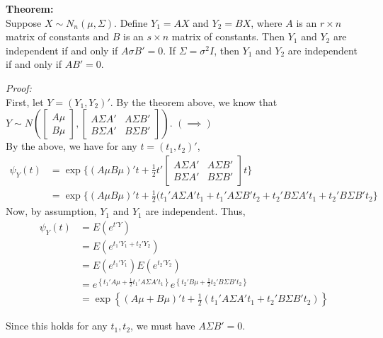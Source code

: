 \documentclass[12pt]{article}
\numberwithin{equation}{section}
\begin{document}
\textbf{Theorem:} \\
Suppose $X \sim N_n(\mu, \Sigma)$. Define $Y_1 = AX$ and $Y_2 = BX$, where $A$ is an $r \times n$ matrix of constants and $B$ is an $s \times n$ matrix of constants. Then $Y_1$ and $Y_2$ are independent if and only if $A \sigma B' = 0$. If  $\Sigma = \sigma^2 I$, then $Y_1$ and $Y_2$ are independent if and only if $AB' = 0$.

\textit{Proof:} \\
First, let $Y = (Y_1, Y_2)'$. By the theorem above, we know that 
$Y \sim N\left( 
  \begin{bmatrix} 
    A\mu \\
    B\mu
  \end{bmatrix},
  \begin{bmatrix}
    A \Sigma A' & A \Sigma B' \\
    B \Sigma A' & B \Sigma B'
  \end{bmatrix}
\right)$.
$(\implies)$ \\
By the above, we have for any $t = (t_1, t_2)'$, 
\begin{align*}
  \psi_Y(t) &= \exp\{(A\mu B\mu)'t + \frac{1}{2} t'  \begin{bmatrix}
    A \Sigma A' & A \Sigma B' \\
    B \Sigma A' & B \Sigma B'
  \end{bmatrix} t \} \\
  &= \exp\{ 
  (A\mu B\mu)'t + \frac{1}{2} (t_1'A\Sigma A't_1 + t_1' A \Sigma B' t_2 + t_2' B \Sigma A' t_1 + t_2' B \Sigma B' t_2
  \}
\end{align*}
Now, by assumption, $Y_1$ and $Y_1$ are independent. Thus, 
\begin{align*}
  \psi_Y(t) &= E(e^{t'Y}) \\
    &= E(e^{t_1'Y_1 + t_2'Y_2}) \\
    &= E(e^{t_1'Y_1}) E(e^{t_2' Y_2}) \\
    &= e^{\left\{t_1'A\mu + \frac{1}{2} t_1' A \Sigma A' t_1\right\}} 
      e^{\left\{t_2'B\mu + \frac{1}{2} t_2' B \Sigma B' t_2\right\}} \\
    &= \exp \left\{(A\mu + B\mu)'t + \frac{1}{2}(t_1' A \Sigma A' t_1 + t_2' B \Sigma B' t_2) \right\}
\end{align*}

Since this holds for any $t_1, t_2$, we must have $A \Sigma B' = 0$.
\end{document}
